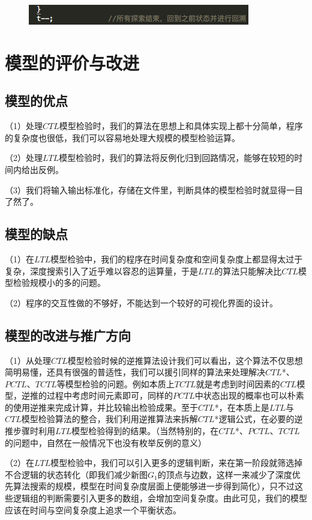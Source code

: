 \documentclass[UTF8]{ctexart}
\begin{document}
\begin{figure}[!htb]
\centering
\includegraphics[scale=0.5]{10.png}
\end{figure}

\section{模型的评价与改进}


\subsection{模型的优点}
（1）处理$CTL$模型检验时，我们的算法在思想上和具体实现上都十分简单，程序的复杂度也很低，我们可以容易地处理大规模的模型检验运算。

（2）处理$LTL$模型检验时，我们的算法将反例化归到回路情况，能够在较短的时间内给出反例。

（3）我们将输入输出标准化，存储在文件里，判断具体的模型检验时就显得一目了然了。

\subsection{模型的缺点}
（1）在$LTL$模型检验中，我们的程序在时间复杂度和空间复杂度上都显得太过于复杂，深度搜索引入了近乎难以容忍的运算量，于是$LTL$的算法只能解决比$CTL$模型检验规模小的多的问题。

（2）程序的交互性做的不够好，不能达到一个较好的可视化界面的设计。

\subsection{模型的改进与推广方向}
（1）从处理$CTL$模型检验时候的逆推算法设计我们可以看出，这个算法不仅思想简明易懂，还具有很强的普适性，我们可以援引同样的算法来处理解决$CTL$*、$PCTL$、$TCTL$等模型检验的问题。例如本质上$TCTL$就是考虑到时间因素的$CTL$模型，逆推的过程中考虑时间元素即可，同样的$PCTL$中状态出现的概率也可以朴素的使用逆推来完成计算，并比较输出检验成果。至于$CTL$*，在本质上是$LTL$与$CTL$模型检验算法的整合，我们利用逆推算法来拆解$CTL$*逻辑公式，在必要的逆推步骤时利用$LTL$模型检验得到的结果。（当然特别的，在$CTL$*、$PCTL$、$TCTL$的问题中，自然在一般情况下也没有枚举反例的意义）

（2）在$LTL$模型检验中，我们可以引入更多的逻辑判断，来在第一阶段就筛选掉不合逻辑的状态转化（即我们减少新图$G_{1}$的顶点与边数，这样一来减少了深度优先算法搜索的规模，模型在时间复杂度层面上便能够进一步得到简化），只不过这些逻辑组的判断需要引入更多的数组，会增加空间复杂度。由此可见，我们的模型应该在时间与空间复杂度上追求一个平衡状态。
\end{document}
